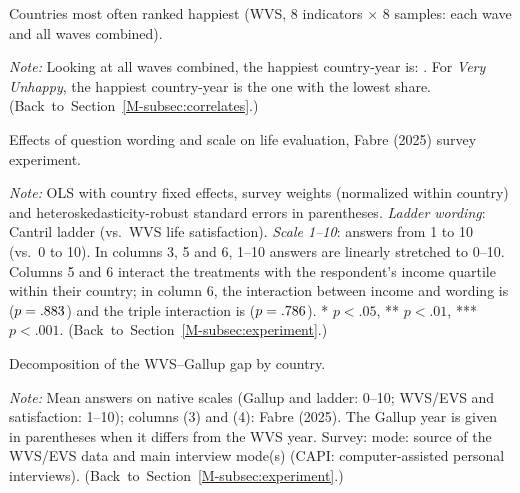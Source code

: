 \documentclass[12pt]{article}
\begin{document}
\begin{table}[htbp]
    \centering
    \caption{Countries most often ranked happiest (WVS, 8 indicators $\times$ 8 samples: each wave and all waves combined).}\label{tab:happiest}
    
    \begin{minipage}{\textwidth}\footnotesize \textit{Note:} Looking at all waves combined, the happiest country-year is: \happiestAllWaves. For \textit{Very Unhappy}, the happiest country-year is the one with the lowest share. \hfill(Back~to~Section~\ref{M-subsec:correlates}.)\end{minipage}
\end{table}

\begin{table}[htbp]
    \centering
    \caption{Effects of question wording and scale on life evaluation, Fabre (2025) survey experiment.}\label{tab:fabre_regressions}
    \begin{adjustbox}{max width=\textwidth}
    
    \end{adjustbox}
    \begin{minipage}{\textwidth}\footnotesize \textit{Note:} OLS with country fixed effects, survey weights (normalized within country) and heteroskedasticity-robust standard errors in parentheses. \textit{Ladder wording}: Cantril ladder (vs.\ WVS life satisfaction). \textit{Scale 1--10}: answers from 1 to 10 (vs.\ 0 to 10). In columns 3, 5 and 6, 1--10 answers are linearly stretched to 0--10. Columns 5 and 6 interact the treatments with the respondent's income quartile within their country; in column 6, the interaction between income and wording is \interactionLadderIncomeFull ($p = .883$) and the triple interaction is \tripleInteraction ($p = .786$). * $p<.05$, ** $p<.01$, *** $p<.001$. \hfill(Back~to~Section~\ref{M-subsec:experiment}.)\end{minipage}
\end{table}

\begin{table}[htbp]
    \centering
    \caption{Decomposition of the WVS--Gallup gap by country.}\label{tab:decomposition_country}
    \begin{adjustbox}{max width=\textwidth}
    
    \end{adjustbox}
    \begin{minipage}{\textwidth}\footnotesize \textit{Note:} Mean answers on native scales (Gallup and ladder: 0--10; WVS/EVS and satisfaction: 1--10); columns (3) and (4): Fabre (2025). The Gallup year is given in parentheses when it differs from the WVS year. Survey: mode: source of the WVS/EVS data and main interview mode(s) (CAPI: computer-assisted personal interviews). \hfill(Back~to~Section~\ref{M-subsec:experiment}.)\end{minipage}
\end{table}
\end{document}
